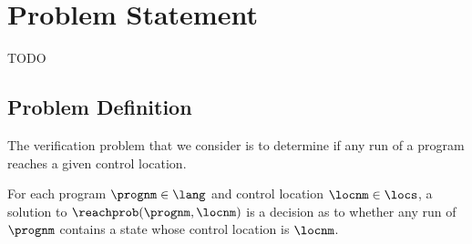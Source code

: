 \section{Problem Statement}
\label{sec:problem-stmt}

TODO

\subsection{Problem Definition}
\label{sec:problem-defn}
%
The verification problem that we consider is to determine if any run
of a program reaches a given control location.
\begin{defn}
  \label{defn:problem-defn}
  For each \lang program $\prognm \in \lang$ and control location
  $\locnm \in \locs$, a solution to $\reachprob(\prognm, \locnm)$ is a
  decision as to whether any run of $\prognm$ contains a state whose
  control location is $\locnm$.
\end{defn}

